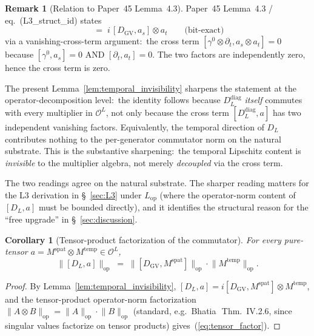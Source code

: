 \documentclass[11pt,a4paper]{article}
\theoremstyle{plain}
\newtheorem{corollary}[theorem]{Corollary}
\theoremstyle{definition}
\newtheorem{remark}[theorem]{Remark}
\newcommand{\Op}{\mathcal{O}}
\newcommand{\opnorm}[1]{\lVert #1 \rVert_{\mathrm{op}}}
\newcommand{\DGV}{D_{\mathrm{GV}}}
\newcommand{\DL}{D_{L}}
\newcommand{\Ddiag}{D_{L}^{\mathrm{diag}}}
\newcommand{\Lop}{L_{\mathrm{op}}}
\newcommand{\spat}{\mathrm{spat}}
\newcommand{\temp}{\mathrm{temp}}
\begin{document}
\begin{remark}[Relation to Paper~45 Lemma~4.3]\label{rem:vs_paper45_L3}
Paper~45 Lemma~4.3 / eq.~(L3\_struct\_id) states
\begin{equation*}
   [\DL, a_{s} \otimes a_{t}] \;=\; i\,[\DGV, a_{s}] \otimes a_{t}
   \qquad \text{(bit-exact)}
\end{equation*}
via a vanishing-cross-term argument:\ the cross term
$[\gamma^{0} \otimes \partial_{t}, a_{s} \otimes a_{t}] = 0$ because
$[\gamma^{0}, a_{s}] = 0$ AND $[\partial_{t}, a_{t}] = 0$. The two
factors are independently zero, hence the cross term is zero.

The present Lemma~\ref{lem:temporal_invisibility} sharpens the
statement at the operator-decomposition level:\ the identity follows
because $\Ddiag$ \emph{itself} commutes with every multiplier in
$\Op^{L}$, not only because the cross term $[\Ddiag, a]$ has two
independent vanishing factors. Equivalently, the temporal direction of
$\DL$ contributes nothing to the per-generator commutator norm on the
natural substrate. This is the substantive sharpening:\ the temporal
Lipschitz content is \emph{invisible} to the multiplier algebra, not
merely \emph{decoupled} via the cross term.

The two readings agree on the natural substrate. The sharper reading
matters for the L3 derivation in \S~\ref{sec:L3} under $\Lop$ (where
the operator-norm content of $[\DL, a]$ must be bounded directly), and
it identifies the structural reason for the ``free upgrade'' in
\S~\ref{sec:discussion}.
\end{remark}

\begin{corollary}[Tensor-product factorization of the commutator]
\label{cor:tensor_factor}
For every pure-tensor $a = M^{\spat} \otimes M^{\temp} \in \Op^{L}$,
\begin{equation}\label{eq:tensor_factor}
   \opnorm{[\DL, a]} \;=\; \opnorm{[\DGV, M^{\spat}]} \cdot \opnorm{M^{\temp}}.
\end{equation}
\end{corollary}

\begin{proof}
By Lemma~\ref{lem:temporal_invisibility},
$[\DL, a] = i [\DGV, M^{\spat}] \otimes M^{\temp}$, and the
tensor-product operator-norm factorization
$\opnorm{A \otimes B} = \opnorm{A} \cdot \opnorm{B}$ (standard, e.g.\
Bhatia~\cite{bhatia1997}\,Thm.~IV.2.6, since singular values factorize
on tensor products) gives~(\ref{eq:tensor_factor}). \qedhere
\end{proof}
\end{document}
